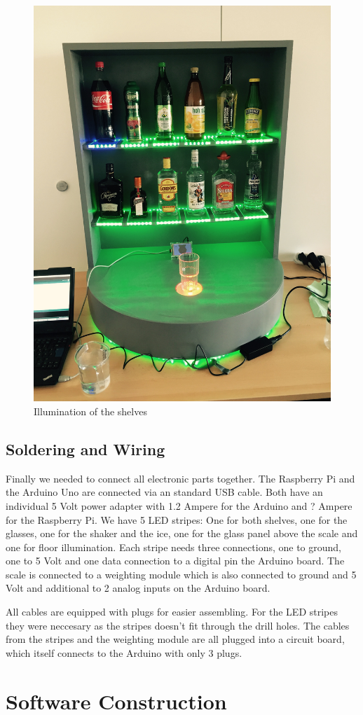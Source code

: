 \documentclass{acm_proc_article-sp}
\begin{document}
\begin{figure}[htbp] 
  \centering
     \includegraphics[width=0.5\linewidth]{pictures/illuminated_shelves.jpg}
  \caption{Illumination of the shelves}
  \label{fig:illuminated_shelves}
\end{figure}


\subsection{Soldering and Wiring}
Finally we needed to connect all electronic parts together. The Raspberry Pi and the Arduino Uno are connected via an standard USB cable. Both have an individual 5 Volt power adapter with 1.2 Ampere for the Arduino and ? Ampere for the Raspberry Pi. We have 5 LED stripes: One for both shelves, one for the glasses, one for the shaker and the ice, one for the glass panel above the scale and one for floor illumination. Each stripe needs three connections, one to ground, one to 5 Volt and one data connection to a digital pin the Arduino board. The scale is connected to a weighting module which is also connected to ground and 5 Volt and additional to 2 analog inputs on the Arduino board.

All cables are equipped with plugs for easier assembling. For the LED stripes they were neccesary as the stripes doesn't fit through the drill holes. The cables from the stripes and the weighting module are all plugged into a circuit board, which itself connects to the Arduino with only 3 plugs. 

\section{Software Construction}
\end{document}
